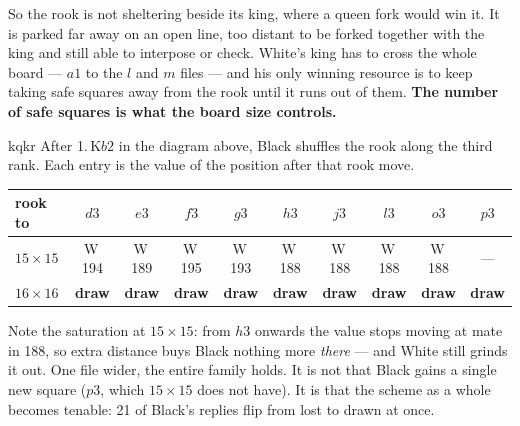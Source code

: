 \documentclass[11pt]{article}
\begin{document}
\smallskip
\noindent
So the rook is not sheltering beside its king, where a queen fork would win it.
It is parked far away on an open line, too distant to be forked together with
the king and still able to interpose or check. White's king has to cross the
whole board --- $a1$ to the $l$ and $m$ files --- and his only winning resource
is to keep taking safe squares away from the rook until it runs out of them.
\textbf{The number of safe squares is what the board size controls.}

\begin{result}[title={The same rook moves: every one loses at 15, every one draws at 16}]{kqkr}
After 1.\,K$b2$ in the diagram above, Black shuffles the rook along the third
rank. Each entry is the value of the position after that rook move.

\begin{center}\small
\begin{tabular}{@{}lccccccccc@{}}
\toprule
rook to & $d3$ & $e3$ & $f3$ & $g3$ & $h3$ & $j3$ & $l3$ & $o3$ & $p3$ \\
\midrule
$15\times15$ & W\,194 & W\,189 & W\,195 & W\,193 & W\,188 & W\,188 & W\,188 &
  W\,188 & --- \\
$16\times16$ & \textbf{draw} & \textbf{draw} & \textbf{draw} & \textbf{draw} &
  \textbf{draw} & \textbf{draw} & \textbf{draw} & \textbf{draw} &
  \textbf{draw} \\
\bottomrule
\end{tabular}
\end{center}

\smallskip
Note the saturation at $15\times15$: from $h3$ onwards the value stops moving at
mate in 188, so extra distance buys Black nothing more \emph{there} --- and White
still grinds it out. One file wider, the entire family holds. It is not that
Black gains a single new square ($p3$, which $15\times15$ does not have). It is
that the scheme as a whole becomes tenable: 21 of Black's replies flip from lost
to drawn at once.
\end{result}
\end{document}
